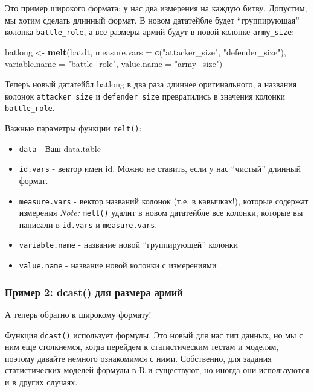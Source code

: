 \documentclass[]{book}
\newenvironment{Shaded}{\begin{snugshade}}{\end{snugshade}}
\newcommand{\KeywordTok}[1]{\textcolor[rgb]{0.13,0.29,0.53}{\textbf{#1}}}
\newcommand{\DataTypeTok}[1]{\textcolor[rgb]{0.13,0.29,0.53}{#1}}
\newcommand{\StringTok}[1]{\textcolor[rgb]{0.31,0.60,0.02}{#1}}
\newcommand{\NormalTok}[1]{#1}
\begin{document}
Это пример широкого формата: у нас два измерения на каждую битву.
Допустим, мы хотим сделать длинный формат. В новом дататейбле будет
``группирующая'' колонка \texttt{battle\_role}, а все размеры армий
будут в новой колонке \texttt{army\_size}:

\begin{Shaded}
\begin{Highlighting}[]
\NormalTok{batlong <-}\StringTok{ }\KeywordTok{melt}\NormalTok{(batdt, }
                \DataTypeTok{measure.vars =} \KeywordTok{c}\NormalTok{(}\StringTok{"attacker_size"}\NormalTok{, }\StringTok{"defender_size"}\NormalTok{),}
                \DataTypeTok{variable.name =} \StringTok{"battle_role"}\NormalTok{, }
                \DataTypeTok{value.name =} \StringTok{"army_size"}\NormalTok{)}
\end{Highlighting}
\end{Shaded}

Теперь новый дататейбл batlong в два раза длиннее оригинального, а
названия колонок \texttt{attacker\_size} и \texttt{defender\_size}
превратились в значения колонки \texttt{battle\_role}.

Важные параметры функции \texttt{melt()}:

\begin{itemize}
\item
  \texttt{data} - Ваш data.table
\item
  \texttt{id.vars} - вектор имен id. Можно не ставить, если у нас
  ``чистый'' длинный формат.
\item
  \texttt{measure.vars} - вектор названий колонок (т.е. в кавычках!),
  которые содержат измерения \emph{Note:} \texttt{melt()} удалит в новом
  дататейбле все колонки, которые вы написали в \texttt{id.vars} и
  \texttt{measure.vars}.
\item
  \texttt{variable.name} - название новой ``группирующей'' колонки
\item
  \texttt{value.name} - название новой колонки с измерениями
\end{itemize}

\subsubsection{Пример 2: dcast() для размера армий}\label{dcast}

А теперь обратно к широкому формату!

Функция \texttt{dcast()} использует формулы. Это новый для нас тип
данных, но мы с ним еще столкнемся, когда перейдем к статистическим
тестам и моделям, поэтому давайте немного ознакомимся с ними.
Собственно, для задания статистических моделей формулы в R и существуют,
но иногда они используются и в других случаях.
\end{document}

